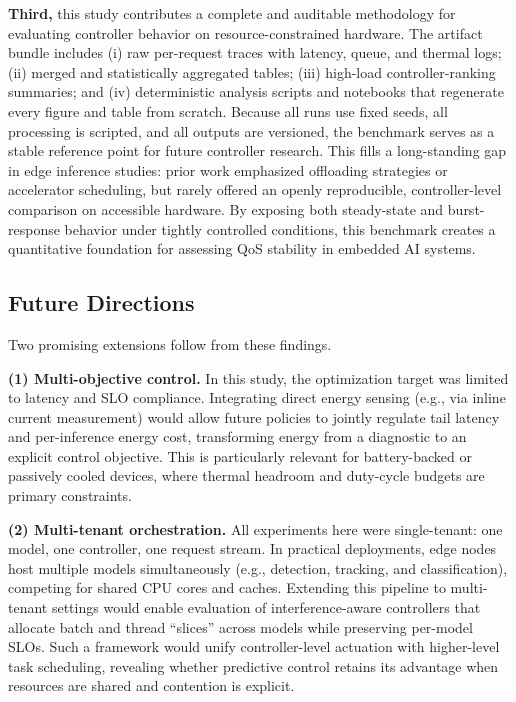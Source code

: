 \documentclass[acmsmall]{acmart}
\begin{document}
\textbf{Third,} this study contributes a complete and auditable methodology for evaluating controller behavior on resource-constrained hardware.  
The artifact bundle includes (i) raw per-request traces with latency, queue, and thermal logs; (ii) merged and statistically aggregated tables; (iii) high-load controller-ranking summaries; and (iv) deterministic analysis scripts and notebooks that regenerate every figure and table from scratch.  
Because all runs use fixed seeds, all processing is scripted, and all outputs are versioned, the benchmark serves as a stable reference point for future controller research.  
This fills a long-standing gap in edge inference studies: prior work emphasized offloading strategies or accelerator scheduling, but rarely offered an openly reproducible, controller-level comparison on accessible hardware.  
By exposing both steady-state and burst-response behavior under tightly controlled conditions, this benchmark creates a quantitative foundation for assessing QoS stability in embedded AI systems.

\subsection*{Future Directions}

Two promising extensions follow from these findings.  

\textbf{(1) Multi-objective control.}  
In this study, the optimization target was limited to latency and SLO compliance.  
Integrating direct energy sensing (e.g., via inline current measurement) would allow future policies to jointly regulate tail latency and per-inference energy cost, transforming energy from a diagnostic to an explicit control objective.  
This is particularly relevant for battery-backed or passively cooled devices, where thermal headroom and duty-cycle budgets are primary constraints.

\textbf{(2) Multi-tenant orchestration.}  
All experiments here were single-tenant: one model, one controller, one request stream.  
In practical deployments, edge nodes host multiple models simultaneously (e.g., detection, tracking, and classification), competing for shared CPU cores and caches.  
Extending this pipeline to multi-tenant settings would enable evaluation of interference-aware controllers that allocate batch and thread ``slices'' across models while preserving per-model SLOs.  
Such a framework would unify controller-level actuation with higher-level task scheduling, revealing whether predictive control retains its advantage when resources are shared and contention is explicit.
\end{document}

